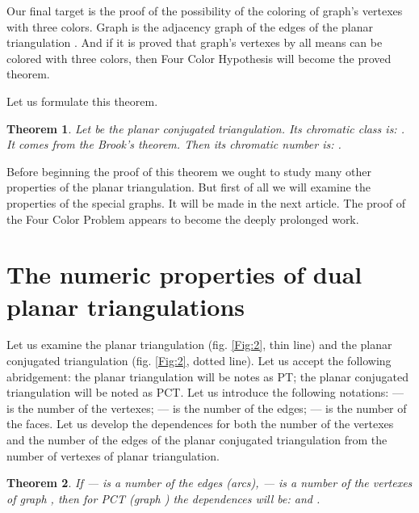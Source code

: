 \documentclass{amsart}
\newtheorem{theorem}{Theorem}
\theoremstyle{plain}
\numberwithin{equation}{section}
\begin{document}
Our final target is the proof of the possibility of the coloring of graph's  vertexes with three colors. Graph  is the adjacency graph of the edges of the planar triangulation . And if it is proved that graph's  vertexes by all means can be colored with three colors, then Four Color Hypothesis will become the proved theorem.

Let us formulate this theorem.

\begin{theorem}
Let  be the planar conjugated triangulation. Its chromatic class is: . It comes from the Brook's theorem. Then its chromatic number is: .
\end {theorem}

Before beginning the proof of this theorem we ought to study many other properties of the planar triangulation. But first of all we will examine the properties of the special graphs. It will be made in the next article. The proof of the Four Color Problem appears to become the deeply prolonged work. 

\section{The numeric properties of dual planar triangulations} 

Let us examine the planar triangulation  (fig. \ref{Fig:2}, thin line) and the planar conjugated triangulation  (fig. \ref{Fig:2}, dotted line). Let us accept the following abridgement: the planar triangulation will be notes as PT; the planar conjugated triangulation will be noted as PCT. Let us introduce the following notations:  --- is the number of the vertexes;  --- is the number of the edges;  --- is the number of the faces. Let us develop the dependences for both the number of the vertexes and the number of the edges of the planar conjugated triangulation from the number of vertexes of planar triangulation.

\begin{theorem}
If  --- is a number of the edges (arcs),  --- is a number of the vertexes of graph , then for PCT (graph ) the dependences will be:  and .
\end{theorem}
\end{document}

